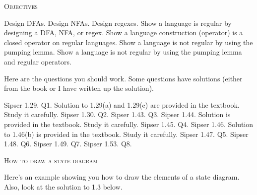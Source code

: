 

\renewcommand\AUTHOR{John Doe}


\topmatter

\textsc{Objectives}
\begin{itemize}
\li Design DFAs.
\li Design NFAs.
\li Design regexes.
\li Show a language is regular by designing a DFA, NFA, or regex.
\li Show a language construction (operator) is a closed operator on regular languages.
\li Show a language is not regular by using the pumping lemma.
\li Show a language is not regular by using the pumping lemma and regular operators.
\end{itemize}

Here are the questions you should work. Some questions have solutions (either from
the book or I have written up the solution).
\begin{myenum}
\li Sipser 1.29. Q1. Solution to 1.29(a) and 1.29(c) are provided in the textbook. Study it carefully. 
\li Sipser 1.30. Q2.
\li Sipser 1.43. Q3.
\li Sipser 1.44. Solution is provided in the textbook. Study it carefully.
\li Sipser 1.45. Q4.
\li Sipser 1.46. Solution to 1.46(b) is provided in the textbook. Study it carefully.
\li Sipser 1.47. Q5.
\li Sipser 1.48. Q6.
\li Sipser 1.49. Q7.
\li Sipser 1.53. Q8.
\end{myenum}

\newpage
\textsc{How to draw a state diagram}

Here's an example showing you how to draw the elements of a state diagram.
Also, look at the solution to 1.3 below.

\begin{center}
\end{center}

